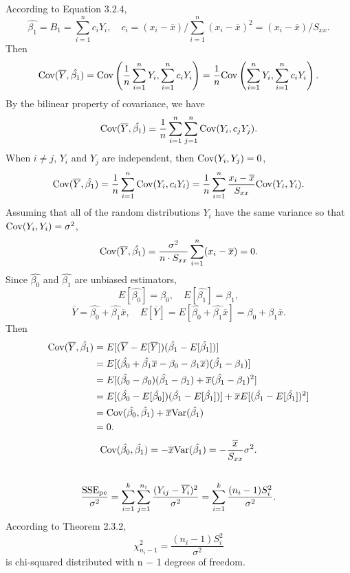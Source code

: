 \documentclass[11pt,a4paper]{article}
\begin{document}
\subsection{}
According to Equation 3.2.4,
$$\hat{\beta_1}=B_1=\sum_{i=1}^nc_iY_i,\quad c_i=(x_i-\overline{x})/\sum_{i=1}^n(x_i-\overline{x})^2=(x_i-\overline{x})/S_{xx}.$$
Then
$${\rm Cov}(\overline{Y},\hat{\beta_1})={\rm Cov}\left(\frac{1}{n}\sum_{i=1}^nY_i,\sum_{i=1}^nc_iY_i\right)=\frac{1}{n}{\rm Cov}\left(\sum_{i=1}^nY_i,\sum_{i=1}^nc_iY_i\right).$$
By the bilinear property of covariance, we have
$${\rm Cov}(\overline{Y},\hat{\beta_1})=\frac{1}{n}\sum_{i=1}^n\sum_{j=1}^n{\rm Cov}(Y_i,c_jY_j).$$
When $i\neq j$, $Y_i$ and $Y_j$ are independent, then ${\rm Cov}(Y_i,Y_j)=0$,
$${\rm Cov}(\overline{Y},\hat{\beta_1})=\frac{1}{n}\sum_{i=1}^n{\rm Cov}(Y_i,c_iY_i)=\frac{1}{n}\sum_{i=1}^n\frac{x_i-\overline{x}}{S_{xx}}{\rm Cov}(Y_i,Y_i).$$
Assuming that all of the random distributions $Y_i$ have the same variance so that ${\rm Cov}(Y_i,Y_i)=\sigma^2$,
$${\rm Cov}(\overline{Y},\hat{\beta_1})=\frac{\sigma^2}{n\cdot S_{xx}}\sum_{i=1}^n(x_i-\overline{x})=0.$$
Since $\hat{\beta_0}$ and $\hat{\beta_1}$ are unbiased estimators,
$$E[\hat{\beta_0}]=\beta_0,\quad E[\hat{\beta_1}]=\beta_1,$$
$$\overline{Y}=\hat{\beta_0}+\hat{\beta_1}\overline{x},\quad E[\overline{Y}]=E[\hat{\beta_0}+\hat{\beta_1}\overline{x}]=\beta_0+\beta_1\overline{x}.$$
Then
\begin{align*}
{\rm Cov}(\overline{Y},\hat{\beta_1})
&=E[(\overline{Y}-E[\overline{Y}])(\hat{\beta_1}-E[\hat{\beta_1}])]\\
&=E[(\hat{\beta_0}+\hat{\beta_1}\overline{x}-\beta_0-\beta_1\overline{x})(\hat{\beta_1}-\beta_1)]\\
&=E[(\hat{\beta_0}-\beta_0)(\hat{\beta_1}-\beta_1)+\overline{x}(\hat{\beta_1}-\beta_1)^2]\\
&=E[(\hat{\beta_0}-E[\hat{\beta_0}])(\hat{\beta_1}-E[\hat{\beta_1}])]+\overline{x}E[(\hat{\beta_1}-E[\hat{\beta_1}])^2]\\
&={\rm Cov}(\hat{\beta_0},\hat{\beta_1})+\overline{x}{\rm Var}(\hat{\beta_1})\\
&=0.
\end{align*}
$${\rm Cov}(\hat{\beta_0},\hat{\beta_1})=-\overline{x}{\rm Var}(\hat{\beta_1})=-\frac{\overline{x}}{S_{xx}}\sigma^2.$$

\subsection{}
$$\frac{\rm SSE_{pe}}{\sigma^2}=\sum_{i=1}^k\sum_{j=1}^{n_i}\frac{(Y_{ij}-\overline{Y_i})^2}{\sigma^2}=\sum_{i=1}^k\frac{(n_i-1)S_i^2}{\sigma^2}.$$
According to Theorem 2.3.2,
$$\chi^2_{n_i-1}=\frac{(n_i-1)S_i^2}{\sigma^2}$$
is chi-squared distributed with n − 1 degrees of freedom.
\end{document}
